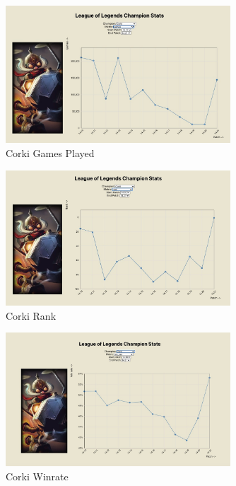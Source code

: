 \documentclass{article}
\begin{document}
\begin{figure}[ht] 
  \centering
  \includegraphics[width=0.75\textwidth]{figs/corki2.jpg}
  \caption{
      Corki Games Played
  }
\end{figure}

\begin{figure}[ht] 
  \centering
  \includegraphics[width=0.75\textwidth]{figs/corki3.jpg}
  \caption{
      Corki Rank
  }
  \label{fig:fig3}
\end{figure}

\begin{figure}[ht] 
  \centering
  \includegraphics[width=0.75\textwidth]{figs/corki4.jpg}
  \caption{
      Corki Winrate
  }
  \label{fig:fig3}
\end{figure}

\begin{refcontext}[sorting=nyt]
\printbibliography
\end{refcontext}
\end{document}
